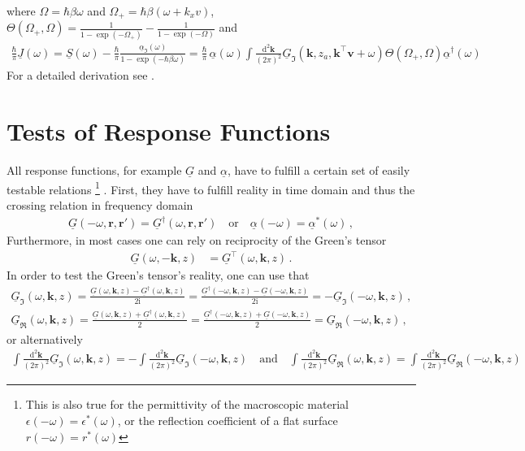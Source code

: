 \documentclass[11pt]{article}
\newcommand{\vv}[1]{\mathbf{#1}}
\newcommand{\ii}[0]{\mathrm{i}}
\newcommand{\dd}[0]{\mathrm{d}}
\begin{document}
where $\Omega=\hbar\beta\omega$ and $\Omega_+=\hbar\beta(\omega+k_xv)$, $\Theta(\Omega_+,\Omega)=\frac{1}{1-\exp(-\Omega_+)} - \frac{1}{1-\exp(-\Omega)}$ and 
\begin{align}
  \frac{\hbar}{\pi}\underline{J}(\omega) =
  \underline{S}(\omega)-\frac{\hbar}{\pi}\frac{\underline{\alpha}_\Im(\omega)}{1-\exp(-\hbar\beta\omega)}=
\frac{\hbar}{\pi}\,
\underline{\alpha}(\omega)\int \frac{\mathrm{d}^2\mathbf{k}}{(2\pi)^2}
\underline{G}_\Im(\mathbf{k},z_a,\mathbf{k}^\intercal \mathbf{v} + \omega)
\Theta(\Omega_+,\Omega)
\underline{\alpha}^\dagger(\omega)
\end{align}
For a detailed derivation see \cite{oelschlager2019a}.
\section{Tests of Response Functions}
All response functions, for example $\underline{G}$ and $\underline{\alpha}$, have to fulfill a certain set of easily testable relations%
\footnote{This is also true for the permittivity of the macroscopic material $\epsilon(-\omega)=\epsilon^*(\omega)$, or the reflection coefficient of a flat surface $r(-\omega)=r^*(\omega)$}%
. First, they have to fulfill reality in time domain and thus the crossing relation in frequency domain
\begin{align}
  \underline{G}(-\omega,\vv r, \vv r') = \underline{G}^\dagger(\omega,\vv r, \vv r')\quad\text{or}\quad
\underline{\alpha}(-\omega) = \underline{\alpha}^*(\omega) \,,
\end{align}
Furthermore, in most cases one can rely on reciprocity of the Green's tensor
\begin{align}
\underline{G}(\omega,-\vv k,z) &= \underline{G}^\intercal(\omega,\vv k, z)\,.
\end{align}
In order to test the Green's tensor's reality, one can use that
\begin{align}
\underline{G}_\Im(\omega,\vv k, z) =\frac{\underline{G}(\omega,\vv k, z) - \underline{G}^\dagger(\omega,\vv k, z)}{2\ii}=
\frac{\underline{G}^\dagger(-\omega,\vv k, z) - \underline{G}(-\omega,\vv k, z)}{2\ii}= -\underline{G}_\Im(-\omega,\vv k, z)\,,\\
\underline{G}_\Re(\omega,\vv k, z) =\frac{\underline{G}(\omega,\vv k, z) + \underline{G}^\dagger(\omega,\vv k, z)}{2}=
\frac{\underline{G}^\dagger(-\omega,\vv k, z) + \underline{G}(-\omega,\vv k, z)}{2}= \underline{G}_\Re(-\omega,\vv k, z)
\,,
\end{align}
or alternatively
\begin{align}
  \int\frac{\dd^2\vv k}{(2\pi)^2}\underline{G}_\Im(\omega,\vv k, z) =
-  \int\frac{\dd^2\vv k}{(2\pi)^2}\underline{G}_\Im(-\omega,\vv k, z)
\quad\text{and}\quad
  \int\frac{\dd^2\vv k}{(2\pi)^2}\underline{G}_\Re(\omega,\vv k, z) =
  \int\frac{\dd^2\vv k}{(2\pi)^2}\underline{G}_\Re(-\omega,\vv k, z)
\end{align}
\end{document}
